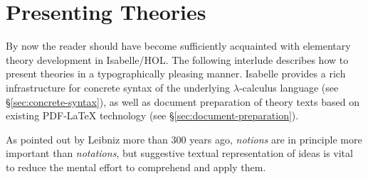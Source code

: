 
\chapter{Presenting Theories}
\label{ch:thy-present}

By now the reader should have become sufficiently acquainted with elementary
theory development in Isabelle/HOL\@.  The following interlude describes
how to present theories in a typographically
pleasing manner.  Isabelle provides a rich infrastructure for concrete syntax
of the underlying $\lambda$-calculus language (see
{\S}\ref{sec:concrete-syntax}), as well as document preparation of theory texts
based on existing PDF-{\LaTeX} technology (see
{\S}\ref{sec:document-preparation}).

As pointed out by Leibniz more than 300
years ago, \emph{notions} are in principle more important than
\emph{notations}, but suggestive textual representation of ideas is vital to
reduce the mental effort to comprehend and apply them.



